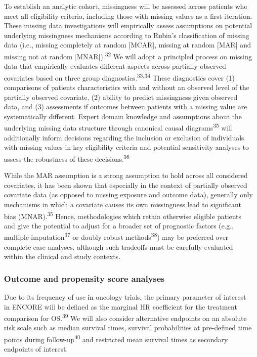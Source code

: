 \documentclass[
  letterpaper,
  DIV=11,
  numbers=noendperiod]{scrartcl}
\begin{document}
To establish an analytic cohort, missingness will be assessed across
patients who meet all eligibility criteria, including those with missing
values as a first iteration. These missing data investigations will
empirically assess assumptions on potential underlying missingness
mechanisms according to Rubin's classification of missing data (i.e.,
missing completely at random {[}MCAR{]}, missing at random {[}MAR{]} and
missing not at random {[}MNAR{]}).\textsuperscript{32} We will adopt a
principled process on missing data that empirically evaluates different
aspects across partially observed covariates based on three group
diagnostics.\textsuperscript{33,34} These diagnostics cover (1)
comparisons of patients characteristics with and without an observed
level of the partially observed covariate, (2) ability to predict
missingness given observed data, and (3) assessments if outcomes between
patients with a missing value are systematically different. Expert
domain knowledge and assumptions about the underlying missing data
structure through canonical causal diagrams\textsuperscript{35} will
additionally inform decisions regarding the inclusion or exclusion of
individuals with missing values in key eligibility criteria and
potential sensitivity analyses to assess the robustness of these
decisions.\textsuperscript{36}

While the MAR assumption is a strong assumption to hold across all
considered covariates, it has been shown that especially in the context
of partially observed covariate data (as opposed to missing exposure and
outcome data), generally only mechanisms in which a covariate causes its
own missingness lead to significant bias (MNAR).\textsuperscript{35}
Hence, methodologies which retain otherwise eligible patients and give
the potential to adjust for a broader set of prognostic factors (e.g.,
multiple imputation\textsuperscript{37} or doubly robust
methods\textsuperscript{38}) may be preferred over complete case
analyses, although such tradeoffs must be carefully evaluated within the
clinical and study contexts.

\subsubsection{Outcome and propensity score
analyses}\label{outcome-and-propensity-score-analyses}

Due to its frequency of use in oncology trials, the primary parameter of
interest in ENCORE will be defined as the marginal HR coefficient for
the treatment comparison for OS.\textsuperscript{39} We will also
consider alternative endpoints on an absolute risk scale such as median
survival times, survival probabilities at pre-defined time points during
follow-up\textsuperscript{40} and restricted mean survival times as
secondary endpoints of interest.
\end{document}
